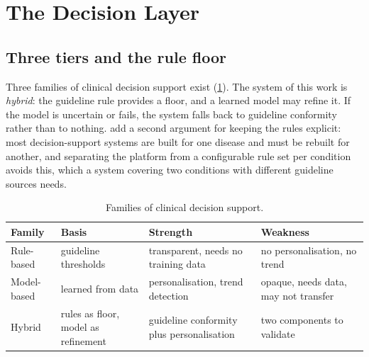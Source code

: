 \section{The Decision Layer}\label{sec:tiers}\label{sec:rule-floor}\label{sec:risk-score}

\subsection{Three tiers and the rule floor}

Three families of clinical decision support exist (\cref{tab:cdss-families}). The system of this work is \emph{hybrid}: the guideline rule provides a floor, and a learned model may refine it. If the model is uncertain or fails, the system falls back to guideline conformity rather than to nothing. \Textcite{yazdani2018} add a second argument for keeping the rules explicit: most decision-support systems are built for one disease and must be rebuilt for another, and separating the platform from a configurable rule set per condition avoids this, which a system covering two conditions with different guideline sources needs.

\begin{table}[htbp]
\centering\footnotesize
\caption{Families of clinical decision support.}\label{tab:cdss-families}
\begin{tabularx}{\textwidth}{@{}>{\raggedright\arraybackslash}p{2.0cm} >{\raggedright\arraybackslash}p{3.2cm} >{\raggedright\arraybackslash}X >{\raggedright\arraybackslash}X@{}}
\toprule
\textbf{Family} & \textbf{Basis} & \textbf{Strength} & \textbf{Weakness} \\
\midrule
Rule-based & guideline thresholds & transparent, needs no training data & no personalisation, no trend \\
Model-based & learned from data & personalisation, trend detection & opaque, needs data, may not transfer \\
Hybrid & rules as floor, model as refinement & guideline conformity plus personalisation & two components to validate \\
\bottomrule
\end{tabularx}
\end{table}

